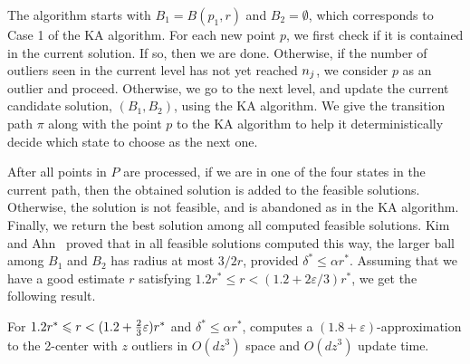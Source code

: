 \documentclass[envcountsame]{cls/cccg15}
\renewcommand{\O}{\ensuremath{{O}}}
\newcommand{\lee}{\leqslant}
\renewcommand{\le}{\lee}
\newcommand{\eps}{\varepsilon}
\newcommand{\REM}[1]{}
\begin{document}
The algorithm starts with $B_1 = B(p_1, r)$ and $B_2 = \emptyset$,
which corresponds to Case 1 of the KA algorithm.
For each new point $p$, we first check if it is contained in the current solution.
If so, then we are done.
Otherwise, if the number of outliers seen in the current level has not yet reached $n_{j}$, 
we consider $p$ as an outlier and proceed.
Otherwise, we go to the next level, and update the current candidate solution, 
$(B_1, B_2)$, using the KA algorithm.
We give the transition path $\pi$ along with the point $p$ to the KA algorithm
to help it deterministically decide which state to choose as the next one.

After all points in $P$ are processed, if we are in one of the four states in the current path,
then the obtained solution is added to the feasible solutions.
Otherwise, the solution is not feasible, and is abandoned as in the KA algorithm.
Finally, we return the best solution among all computed feasible solutions. 
Kim and Ahn~\cite{kim2014improved} proved that in all feasible solutions
computed this way,
the larger ball among $B_1$ and $B_2$ has radius at most $3/2r$,
provided $\delta^* \le \alpha r^*$.
Assuming that we have a good estimate $r$ satisfying
$1.2r^* \le r < (1.2 + 2\eps/3)r^*$,
we get the following result.

\begin{theorem} \label{thm:close}
	For $1.2r^* \le r < (1.2 + {2 \over 3}\eps)r^*$ and $\delta^* \le \alpha r^*$,
	 computes a $(1.8+\eps)$-approximation to 
	the 2-center with $z$ outliers 
	in $\O (dz^3)$ space and $\O (dz^3)$ update time.
\end{theorem}

\REM{
\begin{proof}
Since our algorithm considers all possible input cases of streaming points, there is at least one feasible solution. Since every feasible solution has its larger radius at most $3r/2$, the final solution has larger radius at most $3r/2 \le (1.8 + \eps)r^*$.
For space complexity, our algorithm maintains at most two balls in each case, and therefore it uses $\O(dz^3)$ space. Whenever the next point is inserted, the algorithm updates the solution for each subcase in $\O (d)$ time. Therefore, the algorithm spends $\O (dz^3)$ update time for each point of $P$. Answering a query consists of choosing the minimum radius among all the candidate solutions, which amounts to $\O (dz^3)$ time.
\end{proof}
}
\end{document}
